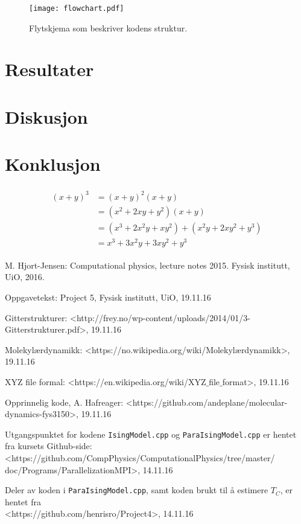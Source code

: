 \documentclass[paper=a4, fontsize=11pt]{scrartcl} %
\numberwithin{equation}{section} %
\numberwithin{figure}{section} %
\numberwithin{table}{section} %
\begin{document}
\FloatBarrier
\begin{figure}[!ht]
 \centering
 \texttt{[image: flowchart.pdf]}
 \caption{Flytskjema som beskriver kodens struktur.}
 \label{flow}
 \end{figure}
 \FloatBarrier


\section{Resultater}

\section{Diskusjon}
\section{Konklusjon}


\begin{align} 
\begin{split}
(x+y)^3 	&= (x+y)^2(x+y)\\
&=(x^2+2xy+y^2)(x+y)\\
&=(x^3+2x^2y+xy^2) + (x^2y+2xy^2+y^3)\\
&=x^3+3x^2y+3xy^2+y^3
\end{split}					
\end{align}








\begin{thebibliography}{9}  
    
\bibitem{}
   M. Hjort-Jensen: Computational physics, lecture notes 2015. Fysisk institutt, UiO, 2016.

\bibitem{}
   Oppgavetekst: Project 5, Fysisk institutt, UiO, 19.11.16
   
\bibitem{}
 Gitterstrukturer: <http://frey.no/wp-content/uploads/2014/01/3-Gitterstrukturer.pdf>, 19.11.16  
 
 \bibitem{}
  Molekylærdynamikk: <https://no.wikipedia.org/wiki/Molekyl$æ$rdynamikk>, 19.11.16
  
\bibitem{}
 XYZ file formal: <https://en.wikipedia.org/wiki/XYZ$\_$file$\_$format>, 19.11.16
 
 \bibitem{}
 Opprinnelig kode, A. Hafreager: <https://github.com/andeplane/molecular-dynamics-fys3150>, 19.11.16
  
  \bibitem{}
  Utgangspunktet for kodene \texttt{IsingModel.cpp} og \texttt{ParaIsingModel.cpp} er hentet fra kursets Github-side:
  <https://github.com/CompPhysics/ComputationalPhysics/tree/master/\\
  doc/Programs/ParallelizationMPI>, 14.11.16
  
\bibitem{}
  Deler av koden i \texttt{ParaIsingModel.cpp}, samt koden brukt til å estimere $T_C$, er hentet fra \\ <https://github.com/henrisro/Project4>,
  14.11.16

   
\end{thebibliography}
\end{document}
